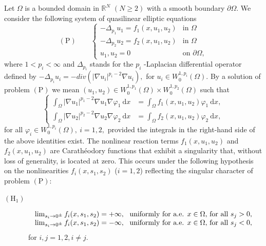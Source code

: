 \documentclass[11pt]{amsart}
\theoremstyle{definition}
\theoremstyle{remark}
\numberwithin{equation}{section}
\begin{document}
Let $\Omega $ is a bounded domain in $%
\mathbb{R}
^{N}$ $\left( N\geq 2\right) $ with a smooth boundary $\partial \Omega $. We
consider the following system of quasilinear elliptic equations%
\begin{equation*}
(\mathrm{P})\qquad \left\{ 
\begin{array}{ll}
-\Delta _{p_{1}}u_{1}=f_{1}(x,u_{1},u_{2}) & \text{in }\Omega \\ 
-\Delta _{p_{2}}u_{2}=f_{2}(x,u_{1},u_{2}) & \text{in }\Omega \\ 
u_{1},u_{2}=0\text{ } & \text{on }\partial \Omega ,%
\end{array}%
\right.
\end{equation*}%
where $1<p_{i}<\infty $ and $\Delta _{p_{i}}$ stands for the $p_{i}$%
-Laplacian differential operator defined by $-\Delta
_{p_{i}}u_{i}=-div(|\nabla u_{i}|^{p_{i}-2}\nabla u_{i}),$ for $u_{i}\in
W_{0}^{1,p_{i}}(\Omega ).$ By a solution of problem $(\mathrm{P})$ we mean $%
(u_{1},u_{2})\in W_{0}^{1,p_{1}}\left( \Omega \right) \times
W_{0}^{1,p_{2}}\left( \Omega \right) $ such that 
\begin{equation*}
\left\{ 
\begin{array}{ll}
\int_{\Omega }\left\vert \nabla u_{1}\right\vert ^{p_{1}-2}\nabla
u_{1}\nabla \varphi _{1}\ \mathrm{d}x & =\int_{\Omega
}f_{1}(x,u_{1},u_{2})\varphi _{1}\ \mathrm{d}x, \\ 
\int_{\Omega }\left\vert \nabla u_{2}\right\vert ^{p_{2}-2}\nabla
u_{2}\nabla \varphi _{2}\ \mathrm{d}x & =\int_{\Omega
}f_{2}(x,u_{1},u_{2})\varphi _{2}\ \mathrm{d}x,%
\end{array}%
\right.
\end{equation*}%
for all $\varphi _{i}\in W_{0}^{1,p_{i}}(\Omega ),\ i=1,2,$ provided the
integrals in the right-hand side of the above identities exist. The
nonlinear reaction terms $f_{1}(x,u_{1},u_{2})$ and $f_{2}(x,u_{1},u_{2})$
are Carath\'{e}odory functions that exhibit a singularity that, without loss
of generality, is located at zero. This occurs under the following
hypothesis on the nonlinearities $f_{i}(x,s_{1},s_{2})$ ($i=1,2$) reflecting
the singular character of problem $(\mathrm{P})$:

\begin{description}
\item[$(\mathrm{H}_{1})$] 
\begin{equation*}
\begin{array}{l}
\lim_{s_{i}\rightarrow 0^{\pm }}f_{i}(x,s_{1},s_{2})=+\infty ,\text{ \
uniformly for a.e. }x\in \Omega \text{, for all }s_{j}>0, \\ 
\lim_{s_{i}\rightarrow 0^{\pm }}f_{i}(x,s_{1},s_{2})=-\infty ,\text{ \
uniformly for a.e. }x\in \Omega \text{, for all }s_{j}<0,%
\end{array}%
\end{equation*}%
\ for $i,j=1,2,i\neq j.$
\end{description}
\end{document}

